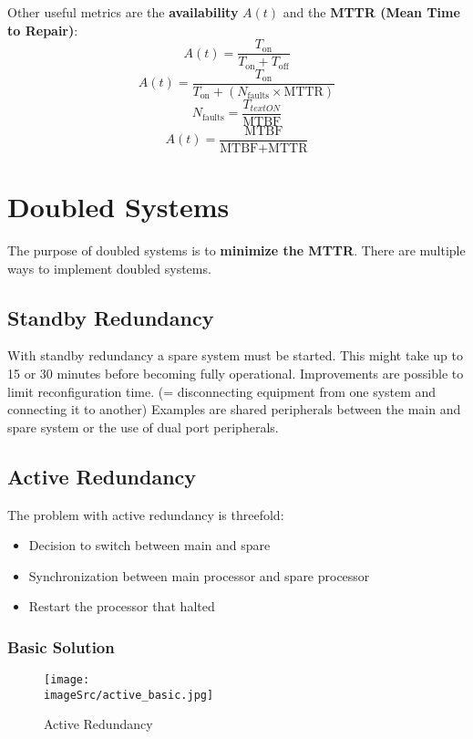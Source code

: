 \documentclass[../main.tex]{subfiles}
\begin{document}
Other useful metrics are the \textbf{availability} $A(t)$ and the \textbf{MTTR (Mean Time to Repair)}:
\[
A(t) = \frac{T_{\text{on}}}{T_{\text{on}} + T_{\text{off}}}
\]
\[
A(t) = \frac{T_{\text{on}}}{T_{\text{on}} + (N_{\text{faults}} \times \text{MTTR})}
\]
\[
N_{\text{faults}} = \frac{T_{text{ON}}}{\text{MTBF}}
\]
\[
A(t) = \frac{\text{MTBF}}{\text{MTBF} + \text{MTTR}}
\]
\section{Doubled Systems}
The purpose of doubled systems is to \textbf{minimize the MTTR}. There are multiple ways to implement doubled systems.

\subsection{Standby Redundancy}
With standby redundancy a spare system must be started. This might take up to 15 or 30 minutes before becoming fully operational. Improvements are possible to limit reconfiguration time. (= disconnecting equipment from one system and connecting it to another) Examples are shared peripherals between the main and spare system or the use of dual port peripherals.

\subsection{Active Redundancy}
The problem with active redundancy is threefold:
\begin{itemize}
	\item Decision to switch between main and spare
	\item Synchronization between main processor and spare processor
	\item Restart the processor that halted
\end{itemize}



\subsubsection{Basic Solution}
\begin{figure}[h!]
    \centering
    \texttt{[image: \\imageSrc/active\_basic.jpg]}
    \caption{Active Redundancy}
    \label{acre}
\end{figure}
\end{document}
